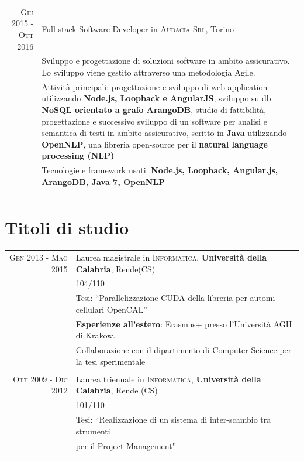 \documentclass[a4paper,10pt]{article}
\begin{document}
\begin{tabular}{r|p{11cm}}

\textsc{Giu 2015 - Ott 2016} & Full-stack Software Developer in \textsc{Audacia Srl}, Torino \emph{}\\
& \footnotesize{Sviluppo e progettazione di soluzioni software in ambito assicurativo. Lo sviluppo viene gestito attraverso una metodologia Agile. }\\
& \footnotesize{Attività principali: progettazione e sviluppo di web application utilizzando \textbf{Node.js, Loopback e AngularJS}, sviluppo su db \textbf{NoSQL orientato a grafo ArangoDB}, studio di fattibilità, progettazione e successivo sviluppo di un software per analisi e semantica di testi in ambito assicurativo, scritto in \textbf{Java} utilizzando \textbf{OpenNLP}, una libreria open-source per il \textbf{natural language processing (NLP)}}\\
& \footnotesize{Tecnologie e framework usati: \textbf{Node.js, Loopback, Angular.js, ArangoDB, Java 7, OpenNLP} }\\
\multicolumn{2}{c}{} \\

\end{tabular}


\section{Titoli di studio}

\begin{tabular}{rl}	
\textsc{Gen 2013 - Mag 2015} & Laurea magistrale in \textsc{Informatica}, \textbf{Università della Calabria}, Rende(CS)\\
& 104/110\\
& Tesi: ``Parallelizzazione CUDA della libreria per automi cellulari OpenCAL''\\
&\textbf{ Esperienze all'estero}: Erasmus+ presso l'Università AGH di Krakow.\\
& Collaborazione con il dipartimento di Computer Science per la tesi sperimentale\\
&\\


\textsc{Ott 2009 - Dic 2012} & Laurea triennale in \textsc{}\textsc{Informatica}, \normalsize\textbf{Università della Calabria}, Rende (CS)\\
 &101/110\\
& Tesi: ``Realizzazione di un sistema di inter-scambio tra strumenti \\
&per il Project
Management" \\
&\\
\end{tabular}
\end{document}
